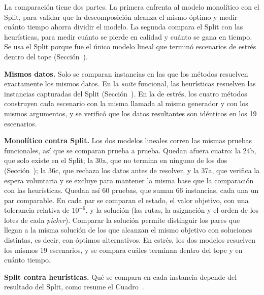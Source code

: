 \stopsection

\startsection[title={Comparación}, reference=sec:comparacion]

La comparación tiene dos partes. La primera enfrenta al modelo monolítico
con el Split, para validar que la descomposición alcanza el mismo óptimo y
medir cuánto tiempo ahorra dividir el modelo. La segunda compara el Split con
las heurísticas, para medir cuánto se pierde en calidad y cuánto se gana en
tiempo. Se usa el Split porque fue el único modelo lineal que
terminó escenarios de estrés dentro del tope (Sección~).

{\bf Mismos datos.} Solo se comparan instancias en las que los métodos
resuelven exactamente los mismos datos. En la {\em suite} funcional, las
heurísticas resuelven las instancias capturadas del Split
(Sección~). En la de estrés, los cuatro métodos
construyen cada escenario con la misma llamada al mismo generador y con los
mismos argumentos, y se verificó que los datos resultantes son idénticos en
los 19 escenarios.

{\bf Monolítico contra Split.} Los dos modelos lineales corren las mismas
pruebas funcionales, así que se comparan prueba a prueba. Quedan afuera
cuatro: la 24b, que solo existe en el Split; la 30a, que no termina en
ninguno de los dos (Sección~); la 36c, que
rechaza los datos antes de resolver, y la 37a, que verifica la espera
voluntaria y se excluye para mantener la misma base que la comparación con
las heurísticas. Quedan así 60 pruebas, que suman 66 instancias, cada una
un par comparable. En cada par se comparan el estado, el valor
objetivo, con una tolerancia relativa de $10^{-6}$, y la solución (las
rutas, la asignación y el orden de los lotes de cada {\em picker}). Comparar
la solución permite distinguir los pares que llegan a la misma solución de
los que alcanzan el mismo objetivo con soluciones distintas, es decir, con
óptimos alternativos. En estrés, los dos modelos resuelven los mismos 19
escenarios, y se compara cuáles terminan dentro del tope y en cuánto tiempo.

{\bf Split contra heurísticas.} Qué se compara en cada instancia depende
del resultado del Split, como resume el Cuadro~.

